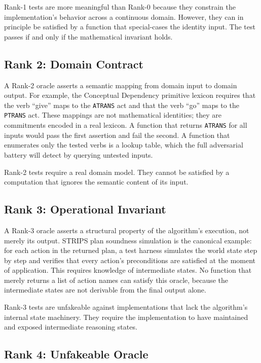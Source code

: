 Rank-1 tests are more meaningful than Rank-0 because they constrain the implementation's
behavior across a continuous domain. However, they can in principle be satisfied by a function
that special-cases the identity input. The test passes if and only if the mathematical
invariant holds.

\subsection{Rank 2: Domain Contract}

A Rank-2 oracle asserts a semantic mapping from domain input to domain output. For example,
the Conceptual Dependency primitive lexicon requires that the verb ``give'' maps to the
\texttt{ATRANS} act and that the verb ``go'' maps to the \texttt{PTRANS} act. These mappings
are not mathematical identities; they are commitments encoded in a real lexicon. A
function that returns \texttt{ATRANS} for all inputs would pass the first assertion and fail
the second. A function that enumerates only the tested verbs is a lookup table, which the
full adversarial battery will detect by querying untested inputs.

Rank-2 tests require a real domain model. They cannot be satisfied by a computation that
ignores the semantic content of its input.

\subsection{Rank 3: Operational Invariant}

A Rank-3 oracle asserts a structural property of the algorithm's execution, not merely its
output. STRIPS plan soundness simulation is the canonical example: for each action in the
returned plan, a test harness simulates the world state step by step and verifies that every
action's preconditions are satisfied at the moment of application. This requires knowledge of
intermediate states. No function that merely returns a list of action names can satisfy this
oracle, because the intermediate states are not derivable from the final output alone.

Rank-3 tests are unfakeable against implementations that lack the algorithm's internal
state machinery. They require the implementation to have maintained and exposed intermediate
reasoning states.

\subsection{Rank 4: Unfakeable Oracle}

